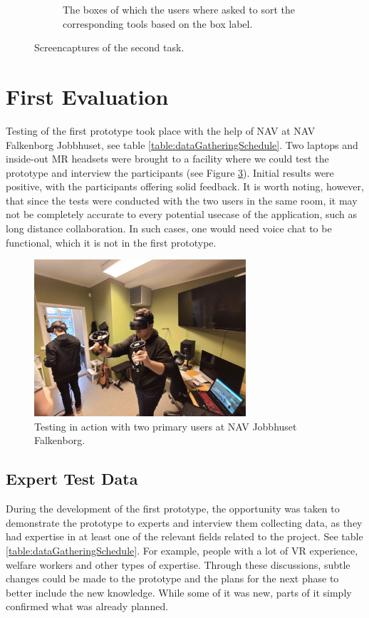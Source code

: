 \begin{figure}[]
\begin{subfigure}[b]{0.65\textwidth}
    \caption{The boxes of which the users where asked to sort the corresponding tools based on the box label.}
    \label{fig:task2SortingBoxes}
  \end{subfigure}
  \hfill%
  \caption{Screencaptures of the second task.}
  \label{fig:phase1Capture2}
\end{figure}


\section{First Evaluation}
Testing of the first prototype took place with the help of NAV at NAV Falkenborg Jobbhuset, see table \ref{table:dataGatheringSchedule}. Two laptops and inside-out MR headsets were brought to a facility where we could test the prototype and interview the participants (see Figure \ref{fig:testingPhase1}). Initial results were positive, with the participants offering solid feedback. It is worth noting, however, that since the tests were conducted with the two users in the same room, it may not be completely accurate to every potential usecase of the application, such as long distance collaboration. In such cases, one would need voice chat to be functional, which it is not in the first prototype.

\begin{figure}[H]
  \centering
    \captionsetup{width=.7\linewidth}
    \includegraphics[width=0.7\textwidth]{fig/phase_1/testingPhase1.jpg}
 \caption{Testing in action with two primary users at NAV Jobbhuset Falkenborg.}
\label{fig:testingPhase1}
\end{figure}


\subsection{Expert Test Data}
During the development of the first prototype, the opportunity was taken to demonstrate the prototype to experts and interview them collecting data, as they had expertise in at least one of the relevant fields related to the project. See table \ref{table:dataGatheringSchedule}. For example, people with a lot of VR experience, welfare workers and other types of expertise. Through these discussions, subtle changes could be made to the prototype and the plans for the next phase to better include the new knowledge. While some of it was new, parts of it simply confirmed what was already planned.


